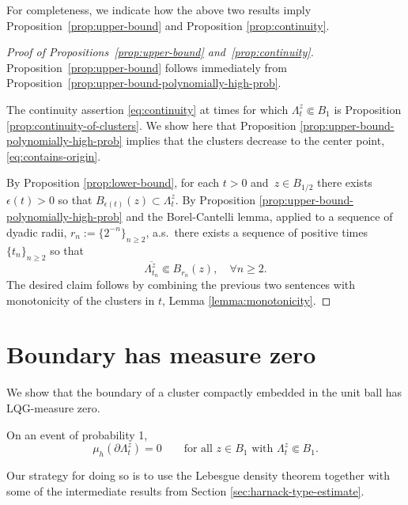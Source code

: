 \documentclass[12pt]{amsart}
\numberwithin{equation}{section}
\newcommand{\cluster}[2]{\hyperref[eq:non-co-set]{\mathit{\Lambda}^{#1}_{#2}}}
\begin{document}
	
	
	For completeness, we indicate how the above two results imply Proposition~\ref{prop:upper-bound} and Proposition \ref{prop:continuity}. 
	
	\begin{proof}[Proof of Propositions~\ref{prop:upper-bound} and~\ref{prop:continuity}]
		Proposition~\ref{prop:upper-bound} follows immediately from Proposition~\ref{prop:upper-bound-polynomially-high-prob}. 
	
		The continuity assertion \eqref{eq:continuity} at times for which ${\cluster{z}{t}} \Subset B_1$ is Proposition \ref{prop:continuity-of-clusters}. 
		We show here that Proposition \ref{prop:upper-bound-polynomially-high-prob} implies that the clusters decrease to the center point, \eqref{eq:contains-origin}. 
		
		By Proposition \ref{prop:lower-bound}, for each $t > 0$ and~$z \in B_{1/2}$ there exists $\epsilon(t) > 0$ so that $B_{\epsilon(t)}(z) \subset {\cluster{z}{t}}$.
		By Proposition \ref{prop:upper-bound-polynomially-high-prob} and the Borel-Cantelli lemma, applied to a sequence of dyadic radii, $r_n := \{2^{-n}\}_{n \geq 2}$, 
		a.s.\ there exists a sequence of positive times $\{t_n\}_{n \geq 2}$ so that 
		\[
		\overline{{\cluster{z}{t_n}}} \Subset B_{r_n}(z), \quad \forall n \geq 2.
		\]
		The desired claim follows by combining the previous two sentences with monotonicity of the clusters in $t$, Lemma \ref{lemma:monotonicity}.
	\end{proof}
	
	
	
	
	\section{Boundary has measure zero} \label{sec:boundary-measure-zero}
	
	We show that the boundary of a cluster compactly embedded in the unit ball has LQG-measure zero. 
	\begin{prop} \label{prop:boundary-measure-zero}
		On an event of probability 1, 
		\[
		\mu_h(\partial {\cluster{z}{t}}) = 0 \qquad \mbox{for all $z \in B_{1}$ with ${\cluster{z}{t}} \Subset B_1$}.
		\]		
	\end{prop}
	Our strategy for doing so is to use the Lebesgue density theorem together with some of the intermediate results from Section \ref{sec:harnack-type-estimate}.
	
\end{document}
